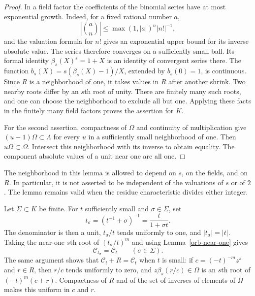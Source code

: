 \begin{proof}
In a field factor the coefficients of the binomial series have at
most exponential growth.  Indeed, for a fixed rational number $a$,
\[
 \left|\binom a n\right|
 \le\max(1,|a|)^n|n!|^{-1},
\]
and the valuation formula for $n!$ gives an exponential upper bound
for its inverse absolute value.  The series therefore converges on
a sufficiently small ball.  Its formal identity
$\beta_s(X)^s=1+X$ is an identity of convergent series there.
The function $b_s(X)=s(\beta_s(X)-1)/X$, extended by $b_s(0)=1$,
is continuous.  Since $R$ is a neighborhood of one, it takes
values in $R$ after another shrink.  Two nearby roots differ by an
$s$th root of unity.  There are finitely many such roots, and one
can choose the neighborhood to exclude all but one.  Applying these
facts in the finitely many field factors proves the assertion for
$K$.

For the second assertion, compactness of $\Omega$ and continuity
of multiplication give $(u-1)\Omega\subset\Lambda$ for every
$u$ in a sufficiently small neighborhood of one.  Then
$u\Omega\subset\Omega$.  Intersect this neighborhood with its
inverse to obtain equality.  The component absolute values of a
unit near one are all one.
\end{proof}

The neighborhood in this lemma is allowed to depend on $s$, on the
fields, and on $R$.  In particular, it is not asserted to be
independent of the valuations of $s$ or of $2$.  The lemma remains
valid when the residue characteristic divides either integer.

Let $\Sigma\subset K$ be finite.  For $t$ sufficiently small and
$\sigma\in\Sigma$, set
\begin{equation}\label{orb-shift}
 t_\sigma=(t^{-1}+\sigma)^{-1}=\frac{t}{1+\sigma t}.
\end{equation}
The denominator is then a unit, $t_\sigma/t$ tends uniformly to one,
and $|t_\sigma|=|t|$.  Taking the near-one $s$th root of
$(t_\sigma/t)^m$ and using Lemma~\ref{orb-near-one} gives
\begin{equation}\label{orb-cut-shift}
 \mathcal C_{t_\sigma}=\mathcal C_t
 \qquad(\sigma\in\Sigma).
\end{equation}
The same argument shows that $\mathcal C_t+R=\mathcal C_t$
when $t$ is small: if $c=(-t)^{-m}z^s$ and $r\in R$, then
$r/c$ tends uniformly to zero, and
$z\beta_s(r/c)\in\Omega$ is an $s$th root of $(-t)^m(c+r)$.
Compactness of $R$ and of the set of inverses of elements of
$\Omega$ makes this uniform in $c$ and $r$.

